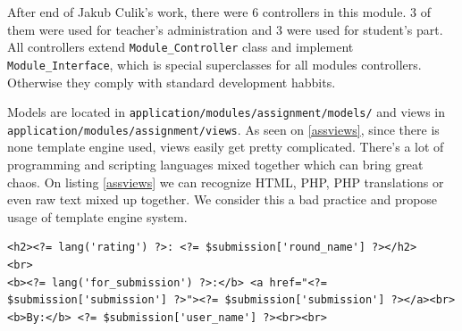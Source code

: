 After end of Jakub Culik's \cite{culik} work, there were 6 controllers in this module. 3 of them were used for teacher's administration and 3 were used for student's part. All controllers extend \texttt{Module\_Controller} class and implement \texttt{Module\_Interface}, which is special superclasses for all modules controllers. Otherwise they comply with standard development habbits.


Models are located in \texttt{application/modules/assignment/models/} and views in \texttt{application/modules/assignment/views}. As seen on \ref{assviews}, since there is none template engine used, views easily get pretty complicated. There's a lot of programming and scripting languages mixed together which can bring great chaos. On listing \ref{assviews} we can recognize HTML, PHP, PHP translations or even raw text mixed up together. We consider this a bad practice and propose usage of template engine system.

\begin{lstlisting}[label={assviews}, caption={Example of view in assignments module}]
<h2><?= lang('rating') ?>: <?= $submission['round_name'] ?></h2>
<br>
<b><?= lang('for_submission') ?>:</b> <a href="<?= $submission['submission'] ?>"><?= $submission['submission'] ?></a><br>
<b>By:</b> <?= $submission['user_name'] ?><br><br>
\end{lstlisting}
